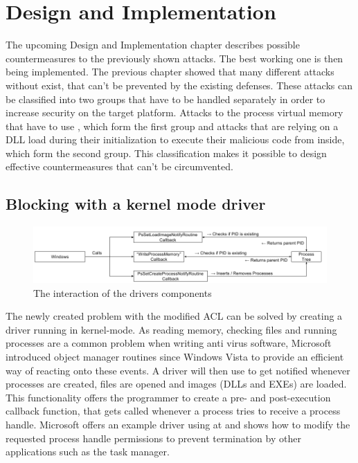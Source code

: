 \section{Design and Implementation}
The upcoming Design and Implementation chapter describes possible countermeasures to the previously shown attacks. The best working one is then being implemented.
\label{sec:implementation}
The previous chapter showed that many different attacks without exist, that can't be prevented by the existing defenses. These attacks can be classified into two groups that have to be handled separately in order to increase security on the target platform. Attacks to the process virtual memory that have to use , which form the first group and attacks that are relying on a DLL load during their initialization to execute their malicious code from inside, which form the second group. This classification makes it possible to design effective countermeasures that can't be circumvented. 

\subsection{Blocking  with a kernel mode driver}
\begin{figure}[!htbp]
\centering
\includegraphics[angle=90,scale=0.6]{sections/implementation/interaction.png}
\caption{The interaction of the drivers components}
\label{fig:interaction}
\end{figure}
The newly created problem with the modified ACL can be solved by creating a driver running in kernel-mode. As reading memory, checking files and running processes are a common problem when writing anti virus software, Microsoft introduced object manager routines since Windows Vista to provide an efficient way of reacting onto these events. A driver will then use  to get notified whenever processes are created, files are opened and images (DLLs and EXEs) are loaded. This functionality offers the programmer to create a pre- and post-execution callback function, that gets called whenever a process tries to receive a process handle. Microsoft offers an example driver using  at \cite{github_obcallback} and shows how to modify the requested process handle permissions to prevent termination by other applications such as the task manager. 


